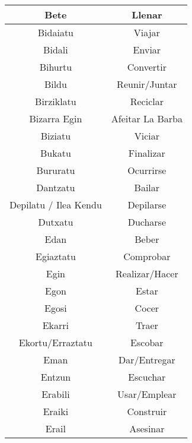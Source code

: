 \documentclass[11pt, a4paper]{article}
\begin{document}
\begin{longtable}{cc}
\hline
Bete                       & Llenar                      \\ 
\hline
Bidaiatu                   & Viajar                      \\ 
\hline
Bidali                     & Enviar                      \\ 
\hline
Bihurtu                    & Convertir                   \\ 
\hline
Bildu                      & Reunir/Juntar               \\ 
\hline
Birziklatu                 & Reciclar                    \\ 
\hline
Bizarra Egin               & Afeitar La Barba            \\ 
\hline
Biziatu                    & Viciar                      \\ 
\hline
Bukatu                     & Finalizar                   \\ 
\hline
Bururatu                   & Ocurrirse                   \\ 
\hline
Dantzatu                   & Bailar                      \\ 
\hline
Depilatu / Ilea Kendu      & Depilarse                   \\ 
\hline
Dutxatu                    & Ducharse                    \\ 
\hline
Edan                       & Beber                       \\ 
\hline
Egiaztatu                  & Comprobar                   \\ 
\hline
Egin                       & Realizar/Hacer              \\ 
\hline
Egon                       & Estar                       \\ 
\hline
Egosi                      & Cocer                       \\ 
\hline
Ekarri                     & Traer                       \\ 
\hline
Ekortu/Erraztatu           & Escobar                     \\ 
\hline
Eman                       & Dar/Entregar                \\ 
\hline
Entzun                     & Escuchar                    \\ 
\hline
Erabili                    & Usar/Emplear                \\ 
\hline
Eraiki                     & Construir                   \\ 
\hline
Erail                      & Asesinar                    \\ 

\end{longtable}
\end{document}
